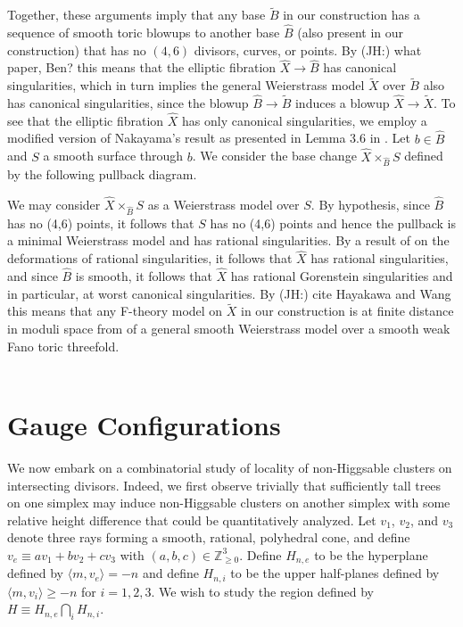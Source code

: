 \documentclass[aps,prl,twocolumn, superscriptaddress,groupedaddress,nofootinbib]{revtex4}
\newcommand{\jh}[1]{{\color{red}(JH:) #1}}
\begin{document}
\vspace{.5cm}
Together, these arguments imply that any base $\tilde B$ in our construction has a sequence of smooth toric blowups to another base $\hat B$ (also present in our construction) that has no $(4,6)$ divisors, curves, or points. By \jh{what paper, Ben?} this means that the elliptic fibration $\hat X \to \hat B$ has canonical singularities, which in turn implies the general Weierstrass model $\tilde X$ over $\tilde B$ also has canonical singularities, since the blowup $\hat B \to \tilde B$ induces a blowup $\hat X\to \tilde X$. To see that the elliptic fibration $\hat{X}$ has only canonical singularities, we employ a modified version of Nakayama's result as presented in Lemma 3.6 in \cite{N}. Let $b\in \hat{B}$ and $S$ a smooth surface through $b$. We consider the base change $\hat{X} \times_{\hat{B}} S$ defined by the following pullback diagram.
\begin{center}
\end{center}
We may consider $\hat{X} \times_{\hat{B}} S$ as a Weierstrass model over $S$. By hypothesis, since $\hat{B}$ has no (4,6) points, it follows that $S$ has no (4,6) points and hence the pullback is a minimal Weierstrass model and has rational singularities. By a result of \cite{E} on the deformations of rational singularities, it follows that $\hat{X}$ has rational singularities, and since $\hat{B}$ is smooth, it follows that $\hat{X}$ has rational Gorenstein singularities and in particular, at worst canonical singularities. By \jh{cite Hayakawa and Wang} this means that any F-theory model
on $\tilde X$ in our construction is at finite distance in moduli space
from of a general smooth Weierstrass model over a smooth weak Fano toric
threefold.\\
\\
\indent

\section{Gauge Configurations}
We now embark on a combinatorial study of locality of non-Higgsable clusters on intersecting divisors. Indeed, we first observe trivially that sufficiently tall trees on one simplex may induce non-Higgsable clusters on another simplex with some relative height difference that could be quantitatively analyzed. Let $v_{1}$, $v_{2}$, and $v_{3}$ denote three rays forming a smooth, rational, polyhedral cone, and define $v_{e} \equiv av_{1} + bv_{2} + cv_{3}$ with $(a,b,c) \in \mathbb{Z}^{3}_{\geq 0}$. Define $H_{n,e}$ to be the hyperplane defined by $\langle m,v_{e} \rangle = -n$ and define $H_{n,i}$ to be the upper half-planes defined by $\langle m,v_{i} \rangle \geq -n$ for $i = 1,2,3$. We wish to study the region defined by $H \equiv H_{n,e} \bigcap\limits_{i}H_{n,i}$. 
\end{document}
